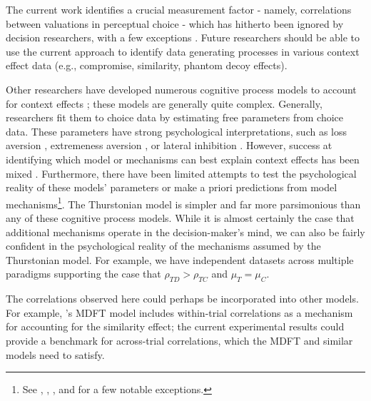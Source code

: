 The current work identifies a crucial measurement factor - namely, correlations between valuations in perceptual choice - which has hitherto been ignored by decision researchers, with a few exceptions \parencite{kamakura1984predicting,natenzon2019random}. Future researchers should be able to use the current approach to identify data generating processes in various context effect data (e.g., compromise, similarity, phantom decoy effects). 

Other researchers have developed numerous cognitive process models to account for context effects \parencite{bergnerVAMPVotingAgent2019b,roeMultialternativeDecisionField2001a,trueblood2014multiattribute,wollschlager2NaryChoiceTree2012a,tversky1993context,tverskyEliminationAspectsTheory1972,bhatiaAssociationsAccumulationPreference2013b,spektor2019similarity,usherLossAversionInhibition2004a,noguchiMultialternativeDecisionSampling2018a}; these models are generally quite complex. Generally, researchers fit them to choice data by estimating free parameters from choice data. These parameters have strong psychological interpretations, such as loss aversion \parencite{usherLossAversionInhibition2004a}, extremeness aversion \parencite{trueblood2014multiattribute}, or lateral inhibition \parencite{roeMultialternativeDecisionField2001a}. However, success at identifying which model or mechanisms can best explain context effects has been mixed  \parencite{turnerCompetingTheoriesMultialternative2018a}. Furthermore, there have been limited attempts to test the psychological reality of these models' parameters or make a priori predictions from model mechanisms\footnote{See \textcite{cataldoFramingContextEffects2020}, \textcite{tsetsosPreferenceReversalMultiattribute2010a}, \textcite{hotalingTheoreticalDevelopmentsDecision2010}, and \textcite{trueblood2013not} for a few notable exceptions.}. The Thurstonian model is simpler and far more parsimonious than any of these cognitive process models. While it is almost certainly the case that additional mechanisms operate in the decision-maker's mind, we can also be fairly confident in the psychological reality of the mechanisms assumed by the Thurstonian model. For example, we have independent datasets across multiple paradigms supporting the case that $\rho_{TD}>\rho_{TC}$ and $\mu_{T}=\mu_{C}$. 

The correlations observed here could perhaps be incorporated into other models. For example, \textcite{roeMultialternativeDecisionField2001a}'s MDFT model includes within-trial correlations as a mechanism for accounting for the similarity effect; the current experimental results could provide a benchmark for across-trial correlations, which the MDFT and similar models need to satisfy.

